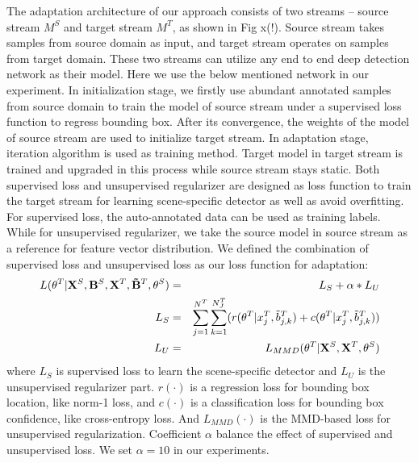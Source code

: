 \documentclass[runningheads]{llncs}
\begin{document}
The adaptation architecture of our approach consists of two streams -- source stream $M^{S}$ and target stream $M^{T}$, as shown in Fig x(!). Source stream takes samples from source domain as input, and target stream operates on samples from target domain. These two streams can utilize any end to end deep detection network as their model. Here we use the below mentioned network in our experiment. In initialization stage, we firstly use abundant annotated samples from source domain to train the model of source stream under a supervised loss function to regress bounding box. After its convergence, the weights of the model of source stream are used to initialize target stream. In adaptation stage, iteration algorithm is used as training method. Target model in target stream is trained and upgraded in this process while source stream stays static. Both supervised loss and unsupervised regularizer are designed as loss function to train the target stream for learning scene-specific detector as well as avoid overfitting. For supervised loss, the auto-annotated data can be used as training labels. While for unsupervised regularizer, we take the source model in source stream as a reference for feature vector distribution. We defined the combination of supervised loss and unsupervised loss as our loss function for adaptation:
\begin{eqnarray}
  L(\theta^{T}|{\bf X}^{S},{\bf B}^{S},{\bf X}^{T},{\bf \tilde{B}}^{T},\theta^{S}) &=& L_{S} + \alpha * L_{U} \\
  L_{S} &=&  \sum^{N^{T}}_{j=1}{\sum^{N^{T}_{J}}_{k=1}( r(\theta^{T}|x^{T}_{j},\tilde{b}^{T}_{j,k})+c(\theta^{T}|x^{T}_{j},\tilde{b}^{T}_{j,k}) )} \\
  L_{U} &=& L_{MMD}(\theta^{T}|{\bf X}^{S},{\bf X}^{T},\theta^{S})
\end{eqnarray}
where $L_{S}$ is supervised loss to learn the scene-specific detector and $L_{U}$ is the unsupervised regularizer part. $r(\cdot)$ is a regression loss for bounding box location, like norm-1 loss, and $c(\cdot)$ is a classification loss for bounding box confidence, like cross-entropy loss. And $L_{MMD}(\cdot)$ is the MMD-based loss for unsupervised regularization. Coefficient $\alpha$ balance the effect of supervised and unsupervised loss. We set $\alpha = 10$ in our experiments.
\end{document}
